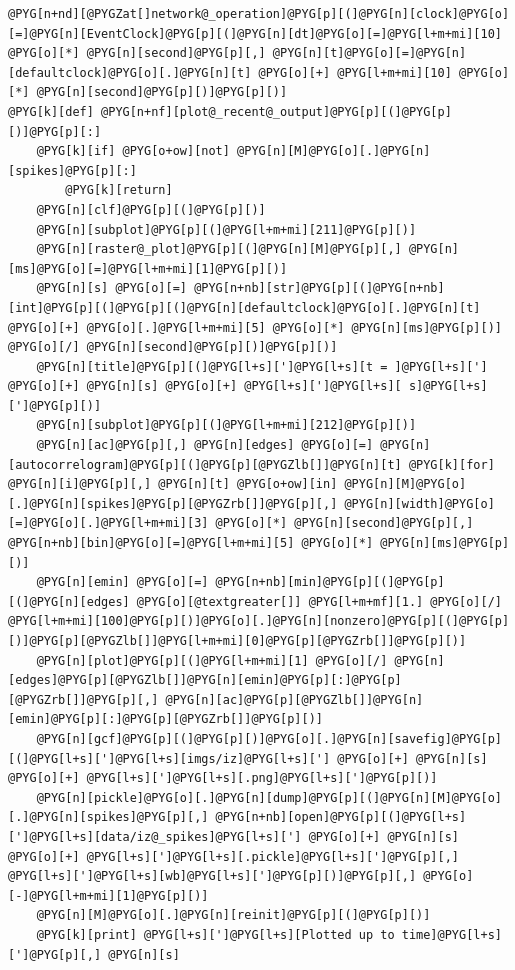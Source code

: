 \documentclass[letterpaper,10pt,english]{manual}
\begin{document}
\begin{Verbatim}[commandchars=@\[\]]
@PYG[n+nd][@PYGZat[]network@_operation]@PYG[p][(]@PYG[n][clock]@PYG[o][=]@PYG[n][EventClock]@PYG[p][(]@PYG[n][dt]@PYG[o][=]@PYG[l+m+mi][10] @PYG[o][*] @PYG[n][second]@PYG[p][,] @PYG[n][t]@PYG[o][=]@PYG[n][defaultclock]@PYG[o][.]@PYG[n][t] @PYG[o][+] @PYG[l+m+mi][10] @PYG[o][*] @PYG[n][second]@PYG[p][)]@PYG[p][)]
@PYG[k][def] @PYG[n+nf][plot@_recent@_output]@PYG[p][(]@PYG[p][)]@PYG[p][:]
    @PYG[k][if] @PYG[o+ow][not] @PYG[n][M]@PYG[o][.]@PYG[n][spikes]@PYG[p][:]
        @PYG[k][return]
    @PYG[n][clf]@PYG[p][(]@PYG[p][)]
    @PYG[n][subplot]@PYG[p][(]@PYG[l+m+mi][211]@PYG[p][)]
    @PYG[n][raster@_plot]@PYG[p][(]@PYG[n][M]@PYG[p][,] @PYG[n][ms]@PYG[o][=]@PYG[l+m+mi][1]@PYG[p][)]
    @PYG[n][s] @PYG[o][=] @PYG[n+nb][str]@PYG[p][(]@PYG[n+nb][int]@PYG[p][(]@PYG[p][(]@PYG[n][defaultclock]@PYG[o][.]@PYG[n][t] @PYG[o][+] @PYG[o][.]@PYG[l+m+mi][5] @PYG[o][*] @PYG[n][ms]@PYG[p][)] @PYG[o][/] @PYG[n][second]@PYG[p][)]@PYG[p][)]
    @PYG[n][title]@PYG[p][(]@PYG[l+s][']@PYG[l+s][t = ]@PYG[l+s]['] @PYG[o][+] @PYG[n][s] @PYG[o][+] @PYG[l+s][']@PYG[l+s][ s]@PYG[l+s][']@PYG[p][)]
    @PYG[n][subplot]@PYG[p][(]@PYG[l+m+mi][212]@PYG[p][)]
    @PYG[n][ac]@PYG[p][,] @PYG[n][edges] @PYG[o][=] @PYG[n][autocorrelogram]@PYG[p][(]@PYG[p][@PYGZlb[]]@PYG[n][t] @PYG[k][for] @PYG[n][i]@PYG[p][,] @PYG[n][t] @PYG[o+ow][in] @PYG[n][M]@PYG[o][.]@PYG[n][spikes]@PYG[p][@PYGZrb[]]@PYG[p][,] @PYG[n][width]@PYG[o][=]@PYG[o][.]@PYG[l+m+mi][3] @PYG[o][*] @PYG[n][second]@PYG[p][,] @PYG[n+nb][bin]@PYG[o][=]@PYG[l+m+mi][5] @PYG[o][*] @PYG[n][ms]@PYG[p][)]
    @PYG[n][emin] @PYG[o][=] @PYG[n+nb][min]@PYG[p][(]@PYG[p][(]@PYG[n][edges] @PYG[o][@textgreater[]] @PYG[l+m+mf][1.] @PYG[o][/] @PYG[l+m+mi][100]@PYG[p][)]@PYG[o][.]@PYG[n][nonzero]@PYG[p][(]@PYG[p][)]@PYG[p][@PYGZlb[]]@PYG[l+m+mi][0]@PYG[p][@PYGZrb[]]@PYG[p][)]
    @PYG[n][plot]@PYG[p][(]@PYG[l+m+mi][1] @PYG[o][/] @PYG[n][edges]@PYG[p][@PYGZlb[]]@PYG[n][emin]@PYG[p][:]@PYG[p][@PYGZrb[]]@PYG[p][,] @PYG[n][ac]@PYG[p][@PYGZlb[]]@PYG[n][emin]@PYG[p][:]@PYG[p][@PYGZrb[]]@PYG[p][)]
    @PYG[n][gcf]@PYG[p][(]@PYG[p][)]@PYG[o][.]@PYG[n][savefig]@PYG[p][(]@PYG[l+s][']@PYG[l+s][imgs/iz]@PYG[l+s]['] @PYG[o][+] @PYG[n][s] @PYG[o][+] @PYG[l+s][']@PYG[l+s][.png]@PYG[l+s][']@PYG[p][)]
    @PYG[n][pickle]@PYG[o][.]@PYG[n][dump]@PYG[p][(]@PYG[n][M]@PYG[o][.]@PYG[n][spikes]@PYG[p][,] @PYG[n+nb][open]@PYG[p][(]@PYG[l+s][']@PYG[l+s][data/iz@_spikes]@PYG[l+s]['] @PYG[o][+] @PYG[n][s] @PYG[o][+] @PYG[l+s][']@PYG[l+s][.pickle]@PYG[l+s][']@PYG[p][,] @PYG[l+s][']@PYG[l+s][wb]@PYG[l+s][']@PYG[p][)]@PYG[p][,] @PYG[o][-]@PYG[l+m+mi][1]@PYG[p][)]
    @PYG[n][M]@PYG[o][.]@PYG[n][reinit]@PYG[p][(]@PYG[p][)]
    @PYG[k][print] @PYG[l+s][']@PYG[l+s][Plotted up to time]@PYG[l+s][']@PYG[p][,] @PYG[n][s]


\end{Verbatim}
\end{document}
